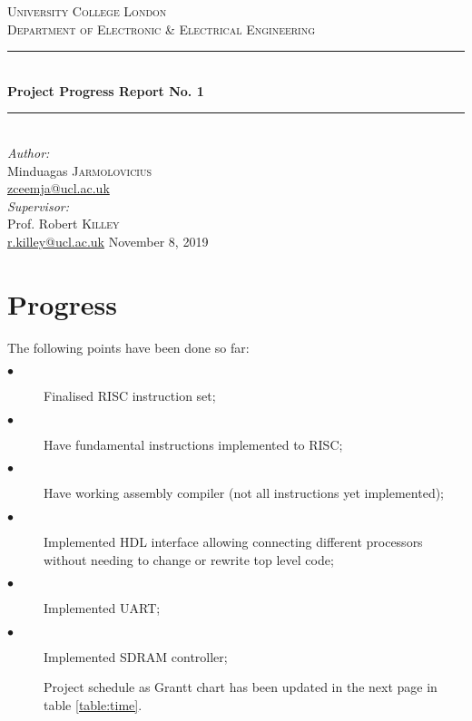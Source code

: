 \documentclass[a4paper,11pt]{article}
\begin{document}
\begin{titlepage}
	\newcommand{\HRule}{\rule{\linewidth}{0.5mm}}
	\center
	\textsc{\Large University College London}\\[0.5cm]
	\textsc{\large Department of Electronic \& Electrical Engineering}\\[0.5cm]
	
	\HRule \\[0.4cm]
	{ \huge \bfseries Project Progress Report No. 1}\\[0.4cm]
	\HRule \\[1.0cm]
	
	\Large \emph{Author:}\\
	Minduagas \textsc{Jarmolovicius}\\
	\href{mailto:zceemja@ucl.ac.uk}{zceemja@ucl.ac.uk}\\[0.5cm]
	
	\Large \emph{Supervisor:}\\
	Prof. Robert \textsc{Killey}\\
	\href{mailto:r.killey@ucl.ac.uk}{r.killey@ucl.ac.uk}
	\vfill
	{\large November 8, 2019}\\[2cm]
	
\end{titlepage}

	

\pagebreak
\section{Progress}
The following points have been done so far:
\begin{description}
	\item[$\bullet$] Finalised RISC instruction set;
	\item[$\bullet$] Have fundamental instructions implemented to RISC;
	\item[$\bullet$] Have working assembly compiler (not all instructions yet implemented);
	\item[$\bullet$] Implemented HDL interface allowing connecting different processors without needing to change or rewrite top level code;
	\item[$\bullet$] Implemented UART;
	\item[$\bullet$] Implemented SDRAM controller;

Project schedule as Grantt chart has been updated in the next page in table \ref{table:time}. 

\end{description}
\end{document}
